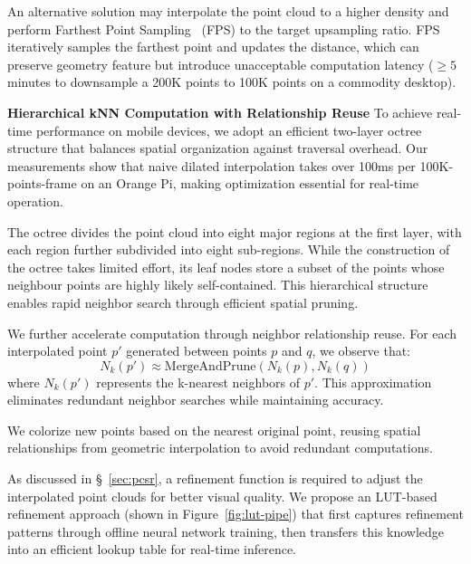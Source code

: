An alternative solution may interpolate the point cloud to a higher density and perform Farthest Point Sampling~\cite{liAdjustableFarthestPoint2022} (FPS) to the target upsampling ratio. FPS iteratively samples the farthest point and updates the distance, which can preserve geometry feature but introduce unacceptable computation latency ($\geq5$ minutes to downsample a 200K points to 100K points on a commodity desktop).

\noindent \textbf{Hierarchical kNN Computation with Relationship Reuse}
To achieve real-time performance on mobile devices, we adopt an efficient two-layer octree~\cite{schnabel_octree-based_nodate} structure that balances spatial organization against traversal overhead. Our measurements show that naive dilated interpolation takes over 100ms per 100K-points-frame on an Orange Pi, making optimization essential for real-time operation.

The octree divides the point cloud into eight major regions at the first layer, with each region further subdivided into eight sub-regions. While the construction of the octree takes limited effort, its leaf nodes store a subset of the points whose neighbour points are highly likely self-contained. This hierarchical structure enables rapid neighbor search through efficient spatial pruning.

We further accelerate computation through neighbor relationship reuse. For each interpolated point $p'$ generated between points $p$ and $q$, we observe that:
\begin{equation}
N_k(p') \approx \text{MergeAndPrune}(N_k(p), N_k(q))
\end{equation}
where $N_k(p')$ represents the k-nearest neighbors of $p'$. This approximation eliminates redundant neighbor searches while maintaining accuracy.

We colorize new points based on the nearest original point, reusing spatial relationships from geometric interpolation to avoid redundant computations.


\label{sec:lut}

As discussed in \S~\ref{sec:pcsr}, a refinement function is required to adjust the interpolated point clouds for better visual quality. We propose an LUT-based refinement approach (shown in Figure~\ref{fig:lut-pipe}) that first captures refinement patterns through offline neural network training, then transfers this knowledge into an efficient lookup table for real-time inference.

